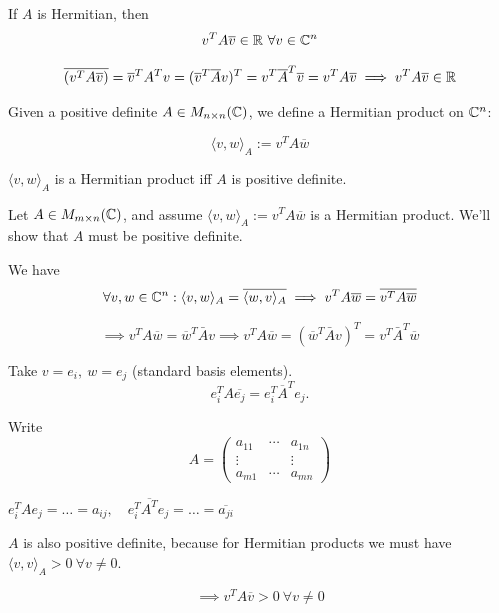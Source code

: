 \documentclass[12pt]{article}
\begin{document}
\begin{remark}{}{}
    If $A$ is Hermitian, then 
    $$
        v^T A \overline{v} \in \mathbb{R} \ \forall v \in \mathbb{C}^n
    $$
\end{remark}

\begin{proofbox}
    $$
        \overline{(v^T A \overline{v})} = \overline{v}^T A^T v = (\overline{v}^T\overline{A}v)^T = v^T\overline{A}^T\overline{v} = v^TA\overline{v} \implies v^TA\overline{v} \in \mathbb{R} 
    $$
\end{proofbox}

\begin{remark}{}{}
    Given a positive definite $A \in M_{n \times n}(\mathbb{C})$, we define a Hermitian product on $\mathbb{C}^n$:

    $$
        \langle v, w \rangle_A := v^T A \overline{w}
    $$

    $\langle v, w \rangle_A$ is a Hermitian product iff $A$ is positive definite.    
\end{remark}

\begin{proofbox}
    Let $A \in M_{m\times n}(\mathbb{C})$, and assume $\langle v, w \rangle_A := v^T A \overline{w}$ is a Hermitian product. We'll show that $A$ must be positive definite.

    We have 
    $$
        \forall v, w \in \mathbb{C}^n : \langle v, w \rangle_A = \overline{\langle w, v \rangle_A} \implies v^T A \overline{w} = \overline{v^T A \overline{w}}
    $$

    $$
        \implies v^T A \overline{w} = \overline{w}^T \bar{A} v \implies v^T A \overline{w} = (\overline{w}^T \bar{A} v)^T = v^T \bar{A}^T \overline{w}
    $$

    Take $v = e_i,\ w = e_j$ (standard basis elements).
    $$
        e_i^T A \overline{e_j} = e_i^T \overline{A}^T e_j.
    $$

    Write
    $$
        A = \begin{pmatrix}
                    a_{11} & \cdots & a_{1n} \\
                    \vdots &  & \vdots \\
                    a_{m1}     & \cdots & a_{mn}
                \end{pmatrix}
    $$

    $e_i^T A e_j = \dots = a_{ij},\quad e_i^T \overline{A^T} e_j = \dots = \overline{a_{ji}}$

    $A$ is also positive definite, because for Hermitian products we must have $\langle v, v \rangle_A > 0 \ \forall v \neq 0$.

    $$
        \implies v^T A \overline{v} > 0 \ \forall v \neq 0
    $$
\end{proofbox}
\end{document}

